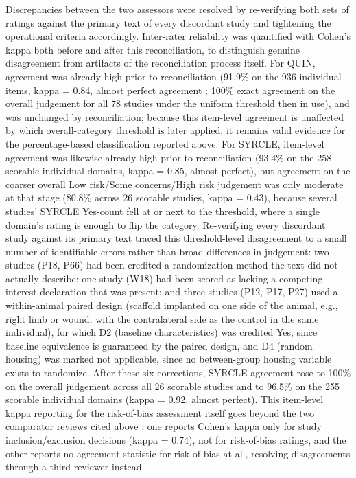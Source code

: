 \documentclass[5p,times,twocolumn]{elsarticle}
\begin{document}
Discrepancies between the two assessors were resolved by re-verifying both sets of ratings against the primary text of every discordant study and tightening the operational criteria accordingly. Inter-rater reliability was quantified with Cohen's kappa both before and after this reconciliation, to distinguish genuine disagreement from artifacts of the reconciliation process itself. For QUIN, agreement was already high prior to reconciliation (91.9\% on the 936 individual items, kappa = 0.84, almost perfect agreement \cite{ref89}; 100\% exact agreement on the overall judgement for all 78 studies under the uniform threshold then in use), and was unchanged by reconciliation; because this item-level agreement is unaffected by which overall-category threshold is later applied, it remains valid evidence for the percentage-based classification reported above. For SYRCLE, item-level agreement was likewise already high prior to reconciliation (93.4\% on the 258 scorable individual domains, kappa = 0.85, almost perfect), but agreement on the coarser overall Low risk/Some concerns/High risk judgement was only moderate at that stage (80.8\% across 26 scorable studies, kappa = 0.43), because several studies' SYRCLE Yes-count fell at or next to the threshold, where a single domain's rating is enough to flip the category. Re-verifying every discordant study against its primary text traced this threshold-level disagreement to a small number of identifiable errors rather than broad differences in judgement: two studies (P18, P66) had been credited a randomization method the text did not actually describe; one study (W18) had been scored as lacking a competing-interest declaration that was present; and three studies (P12, P17, P27) used a within-animal paired design (scaffold implanted on one side of the animal, e.g., right limb or wound, with the contralateral side as the control in the same individual), for which D2 (baseline characteristics) was credited Yes, since baseline equivalence is guaranteed by the paired design, and D4 (random housing) was marked not applicable, since no between-group housing variable exists to randomize. After these six corrections, SYRCLE agreement rose to 100\% on the overall judgement across all 26 scorable studies and to 96.5\% on the 255 scorable individual domains (kappa = 0.92, almost perfect). This item-level kappa reporting for the risk-of-bias assessment itself goes beyond the two comparator reviews cited above \cite{ref90,ref91}: one reports Cohen's kappa only for study inclusion/exclusion decisions (kappa = 0.74), not for risk-of-bias ratings, and the other reports no agreement statistic for risk of bias at all, resolving disagreements through a third reviewer instead.
\end{document}
